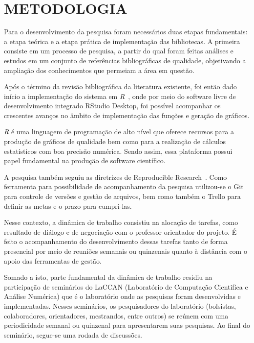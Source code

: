 \documentclass[12pt,letterpaper]{article}
\begin{document}
\newpage
\section*{\centering \textbf{METODOLOGIA}} %

Para o desenvolvimento da pesquisa foram necessários duas etapas fundamentais: a etapa teórica e a etapa prática de implementação das bibliotecas.
A primeira consiste em um processo de pesquisa, a partir do qual foram feitas análises e estudos em um conjunto de referências bibliográficas de qualidade, objetivando a ampliação dos conhecimentos que permeiam a área em questão. 

Após o término da revisão bibliográfica da literatura existente, foi então dado início a implementação do sistema em \textit{R}~\cite{RCore}, onde por meio do software livre de desenvolvimento integrado RStudio Desktop, foi possível acompanhar os crescentes avanços no âmbito de implementação das funções e geração de gráficos.

\textit{R} é uma linguagem de programação de alto nível que oferece recursos para a	produção de gráficos de qualidade bem como para	 a realização de cálculos estatísticos com boa precisão numérica. Sendo assim, essa plataforma possui papel fundamental na produção de software científico.

A pesquisa também seguiu as diretrizes de Reproducible Research~\cite{ReproducibleResearch}. Como ferramenta para possibilidade de acompanhamento da pesquisa utilizou-se o Git para controle de versões e gestão de arquivos, bem como também o Trello para definir as metas e o prazo para cumpri-las.

Nesse contexto, a dinâmica de trabalho consistiu na alocação de tarefas, como resultado de diálogo e de negociação com o professor orientador do projeto. É feito o acompanhamento do desenvolvimento dessas tarefas tanto de forma presencial por meio de reuniões semanais ou quinzenais quanto à distância com o apoio das ferramentas de gestão.

	Somado a isto, parte fundamental da dinâmica de trabalho residiu na participação de seminários do LaCCAN (Laboratório de Computação Cientifíca e Análise Numérica) que é o laboratório onde as pesquisas foram desenvolvidas e implementadas. Nesses seminários, os pesquisadores do laboratório (bolsistas, colaboradores, orientadores, mestrandos, entre outros) se reúnem com uma periodicidade semanal ou quinzenal para apresentarem suas pesquisas. Ao final do seminário, segue-se uma rodada de discussões.
    
\end{document}
